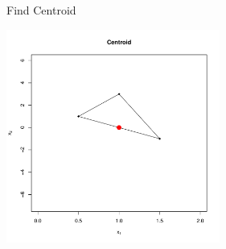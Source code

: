 \documentclass[10pt]{beamer}
\begin{document}
                                                                                              \begin{frame}{Find Centroid}
                                                                                                \begin{center}
                                                                                                  \includegraphics[height=7cm]{RCode/nmcent.pdf}
                                                                                                \end{center}
                                                                                              \end{frame}
\end{document}
